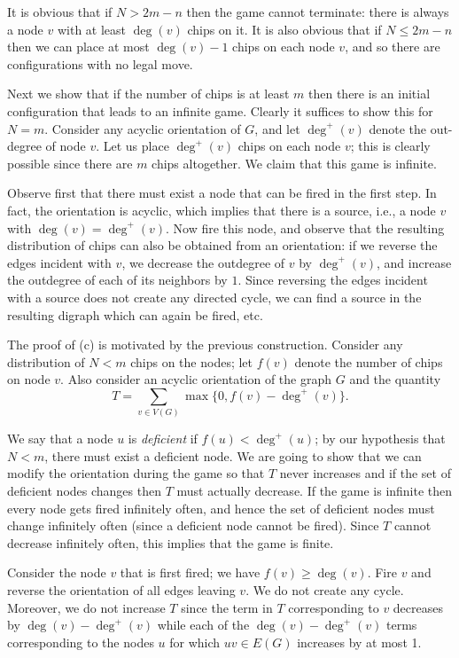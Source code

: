 It is obvious that if $N > 2m-n$ then the game cannot terminate: there is always a node $v$ with at least $\deg(v)$ chips on it. It is also obvious that if $N \leq 2m-n$ then we can place at most $\deg(v)-1$ chips on each node $v$, and so there are configurations with no legal move.

Next we show that if the number of chips is at least $m$ then there is an initial configuration that leads to an infinite game. Clearly it suffices to show this for $N=m$. Consider any acyclic orientation of $G$, and let $\deg^+(v)$ denote the out-degree of node $v$. Let us place $\deg^+(v)$ chips on each node $v$; this is clearly possible since there are $m$ chips altogether. We claim that this game is infinite.

Observe first that there must exist a node that can be fired in the first step. In fact, the orientation is acyclic, which implies that there is a source, i.e., a node $v$ with $\deg(v) = \deg^+(v)$. Now fire this node, and observe that the resulting distribution of chips can also be obtained from an orientation: if we reverse the edges incident with $v$, we decrease the outdegree of $v$ by $\deg^+(v)$, and increase the outdegree of each of its neighbors by $1$. Since reversing the edges incident with a source does not create any directed cycle, we can find a source in the resulting digraph which can again be fired, etc.

The proof of (c) is motivated by the previous construction. Consider any distribution of $N < m$ chips on the nodes; let $f(v)$ denote the number of chips on node $v$. Also consider an acyclic orientation of the graph $G$ and the quantity \[T = \sum_{v \in V(G)}\max\{0, f(v) - \deg^+(v)\}.\]

We say that a node $u$ is \emph{deficient} if $f(u) < \deg^+(u)$; by our hypothesis that $N < m$, there must exist a deficient node. We are going to show that we can modify the orientation during the game so that $T$ never increases and if the set of deficient nodes changes then $T$ must actually decrease. If the game is infinite then every node gets fired infinitely often, and hence the set of deficient nodes must change infinitely often (since a deficient node cannot be fired). Since $T$ cannot decrease infinitely often, this implies that the game is finite.

Consider the node $v$ that is first fired; we have $f(v) \geq \deg(v)$. Fire $v$ and reverse the orientation of all edges leaving $v$. We do not create any cycle. Moreover, we do not increase $T$ since the term in $T$ corresponding to $v$ decreases by $\deg(v) - \deg^+(v)$ while each of the $\deg(v)-\deg^+(v)$ terms corresponding to the nodes $u$ for which $uv \in E(G)$ increases by at most 1.

